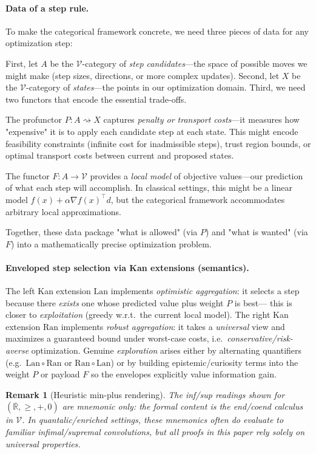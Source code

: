 \documentclass[11pt]{article}
\numberwithin{equation}{section}
\theoremstyle{upright}
\newtheorem{remark}{Remark}
\newcommand{\V}{\mathcal{V}}
\newcommand{\Lan}{\mathrm{Lan}}
\newcommand{\Ran}{\mathrm{Ran}}
\newcommand{\profto}{\rightsquigarrow}
\begin{document}
\paragraph{Data of a step rule.}
To make the categorical framework concrete, we need three pieces of data for any optimization step:

First, let $A$ be the $\V$-category of \emph{step candidates}—the space of possible moves we might make (step sizes, directions, or more complex updates). Second, let $X$ be the $\V$-category of \emph{states}—the points in our optimization domain. Third, we need two functors that encode the essential trade-offs.

The profunctor $P:A\profto X$ captures \emph{penalty or transport costs}—it measures how "expensive" it is to apply each candidate step at each state. This might encode feasibility constraints (infinite cost for inadmissible steps), trust region bounds, or optimal transport costs between current and proposed states.

The functor $F:A\to\V$ provides a \emph{local model} of objective values—our prediction of what each step will accomplish. In classical settings, this might be a linear model $f(x) + \alpha \nabla f(x)^\top d$, but the categorical framework accommodates arbitrary local approximations.

Together, these data package "what is allowed" (via $P$) and "what is wanted" (via $F$) into a mathematically precise optimization problem.

\paragraph{Enveloped step selection via Kan extensions (semantics).}
The left Kan extension $\Lan$ implements \emph{optimistic aggregation}: it selects a
step because there \emph{exists} one whose predicted value plus weight $P$ is best—
this is closer to \emph{exploitation} (greedy w.r.t.\ the current local model).
The right Kan extension $\Ran$ implements \emph{robust aggregation}: it takes a
\emph{universal} view and maximizes a guaranteed bound under worst-case costs,
i.e.\ \emph{conservative/risk-averse} optimization. Genuine \emph{exploration}
arises either by alternating quantifiers (e.g.\ $\Lan\!\circ\!\Ran$ or $\Ran\!\circ\!\Lan$)
or by building epistemic/curiosity terms into the weight $P$ or payload $F$ so the
envelopes explicitly value information gain.

\begin{remark}[Heuristic min-plus rendering]
The inf/sup readings shown for $(\overline{\mathbb R},\ge,+,0)$ are mnemonic only: the formal content is the end/coend calculus in $\V$. In quantalic/enriched settings, these mnemonics often \emph{do} evaluate to familiar infimal/supremal convolutions, but all proofs in this paper rely solely on universal properties.
\end{remark}
\end{document}
